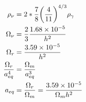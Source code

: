 \begin{align*}
    \rho_\nu &= 2 * \frac{7}{8}\qty(\frac{4}{11})^{4/3}\rho_\gamma\\
    \Omega_\nu &= \frac{2}{3} \frac{1.68\times10^{-5}}{h^2}\\
    \Omega_r &= \frac{3.59\times10^{-5}}{h^2}\\
    \frac{\Omega_r}{a_{eq}^4} &= \frac{\Omega_m}{a_{eq}^3}\\
    a_{eq} &= \frac{\Omega_r}{\Omega_m} = \frac{3.59\times10^{-5}}{\Omega_m h^2}
\end{align*}